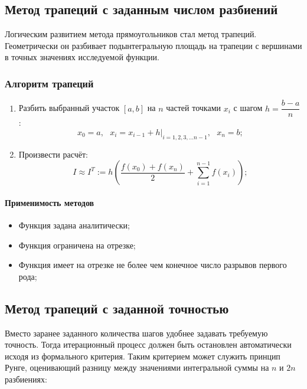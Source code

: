 \documentclass[a4paper, 14pt]{article}
\begin{document}
\subsection{Метод трапеций с заданным числом разбиений}
Логическим развитием метода прямоугольников стал метод трапеций. Геометрически он разбивает подынтегральную площадь на трапеции с вершинами в точных значениях исследуемой функции.

\subsubsection{Алгоритм трапеций}
\begin{enumerate}
    \item Разбить выбранный участок $[a,b]$ на $n$ частей точками $x_i$ с шагом $h=\dfrac{b-a}{n}$:$$
    x_0=a,~~~x_i=x_{i-1}+h|_{i=1,2,3,...n-1},~~~ x_n=b;$$

    \item Произвести расчёт:
    \begin{equation}
        I\approx I^T := h\left( \dfrac{f(x_0)+f(x_n)}{2} + \sum_{i=1}^{n-1}f(x_i)\right) ;
    \end{equation}
\end{enumerate}

\paragraph{Применимость методов}
\begin{itemize}
    \item Функция задана аналитически;

    \item Функция ограничена на отрезке;

    \item Функция имеет на отрезке не более чем конечное число разрывов первого рода;
\end{itemize}


\subsection{Метод трапеций с заданной точностью}
\label{sec:trapez_runge}

Вместо заранее заданного количества шагов удобнее задавать требуемую точность. Тогда итерационный процесс должен быть остановлен автоматически исходя из формального критерия. Таким критерием может служить принцип Рунге, оценивающий разницу между значениями интегральной суммы на $n$ и $2n$ разбиениях:
\end{document}
